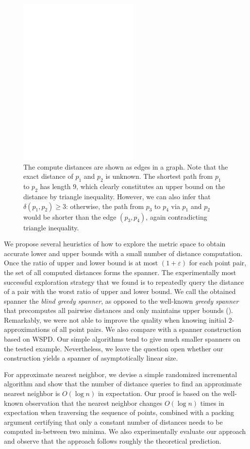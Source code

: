 \documentclass[a4paper,UKenglish,cleveref, autoref]{lipics-v2019}
\newcommand{\eps}{\varepsilon}
\newcommand{\dist}{\delta}
\begin{document}
\begin{figure}[h]
\centering
\includegraphics[width=6cm]{intro_example.eps}
\caption{The compute distances are shown as edges in a graph. Note that the exact distance
of $p_1$ and $p_2$ is unknown. The shortest path from $p_1$ to $p_2$ has length $9$, which clearly
constitutes an upper bound on the distance by triangle inequality.
However, we can also infer that $\dist(p_1,p_2)\geq 3$:
otherwise, the path from $p_3$ to $p_4$ via $p_1$ and $p_2$
would be shorter than the edge $(p_3,p_4)$, again contradicting
triangle inequality.}
\label{fig:1st_example}
\end{figure}

We propose several heuristics of how to explore the metric space to obtain accurate lower and upper bounds
with a small number of distance computation. Once the ratio of upper and lower bound is at most $(1+\eps)$
for each point pair, the set of all computed distances forms the spanner.
The experimentally most successful exploration strategy that we found is to
repeatedly query the distance of a pair with the worst ratio of upper and lower bound.
We call the obtained spanner the \emph{blind greedy spanner}, as opposed to the well-known
\emph{greedy spanner} that precomputes all pairwise distances and only maintains upper bounds (\cite{althofer1993sparse}).
Remarkably, we were not able to improve the quality when knowing initial $2$-approximations of all point pairs.
We also compare with a spanner construction based on WSPD. Our simple algorithms tend to give much smaller
spanners on the tested example. Nevertheless, we leave the question open whether our construction
yields a spanner of asymptotically linear size.

For approximate nearest neighbor, we devise a simple randomized incremental algorithm and show that
the number of distance queries to find an approximate nearest neighbor is $O(\log n)$ in expectation.
Our proof is based on the well-known observation that the nearest neighbor changes $O(\log n)$ times
in expectation when traversing the sequence of points, combined with a packing argument certifying that
only a constant number of distances needs to be computed in-between two minima.
We also experimentally evaluate our approach and observe that the approach follows 
roughly the theoretical prediction.
\end{document}
